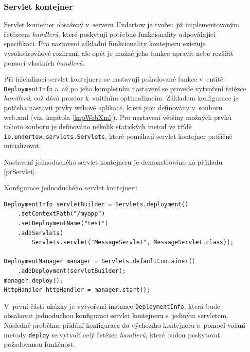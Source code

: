             \subsubsection{Servlet kontejner}
                Servlet kontejner obsažený v~serveru Undertow je tvořen již implementovaným
                řetězcem \emph{handlerů}, které poskytují potřebné funkcionality odpovídající specifikaci.
                Pro nastavení základní funkcionality kontejneru existuje vysokoúrovňové rozhraní,
                ale opět je možné jeho funkce upravit nebo rozšířit pomocí vlastních \emph{handlerů}. 

                Při inicializaci servlet kontejneru se nastavují požadované funkce v~entitě \texttt{DeploymentInfo}
                a~až po jeho kompletním nastavení se provede vytvoření řetězce \emph{handlerů}, což
                dává prostor k~vnitřním optimalizacím. 
                Základem konfigurace je potřeba nastavit prvky webové aplikace, které jsou definovány v~souboru web.xml (viz. kapitola \ref{kapWebXml}).
                Pro nastavení většiny možných prvků tohoto souboru je
                definováno několik statických metod ve třídě \\\texttt{io.undertow.servlets.Servlets}, které    
                pomáhají servlet kontejner patřičně inicializovat.

                Nastavení jednoduchého servlet kontejneru je demonstrováno na příkladu \ref{prServlet}.

\begin{priklad} \label{prServlet} Konfigurace jednoduchého servlet kontejneru
\begin{verbatim}
DeploymentInfo servletBuilder = Servlets.deployment()
    .setContextPath("/myapp")
    .setDeploymentName("test")
    .addServlets(
        Servlets.servlet("MessageServlet", MessageServlet.class));

DeploymentManager manager = Servlets.defaultContainer()
    .addDeployment(servletBuilder);
manager.deploy();
HttpHandler httpHandler = manager.start();
\end{verbatim}
\end{priklad}
                V~první části ukázky je vytvořená instance \texttt{DeploymentInfo}, která bude obsahovat jednoduchou konfiguraci
                servlet kontejneru s~jediným servletem. Následně proběhne přidání konfigurace do výchozího kontejneru 
                a~pomocí volání metody \texttt{deploy}
                se vytvoří celý řetězec \emph{handlerů}, které budou poskytovat požadovanou funkčnost.
                
